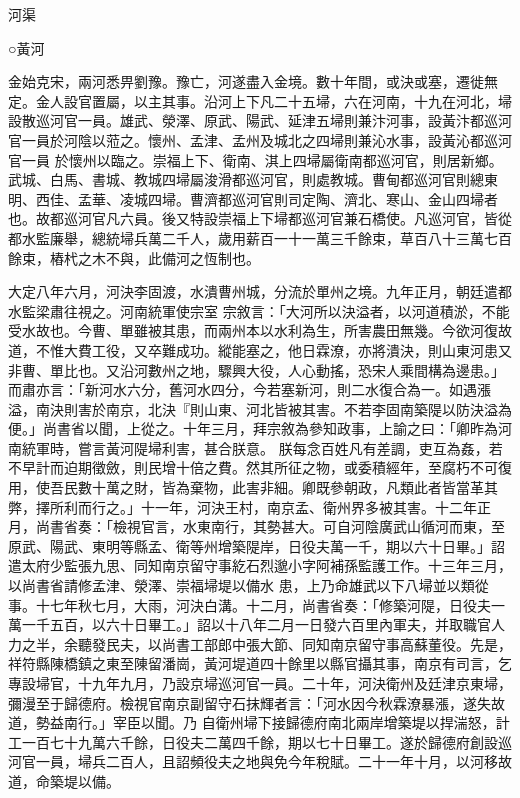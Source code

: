 
\begin{pinyinscope}

 河渠



 ○黃河



 金始克宋，兩河悉畀劉豫。豫亡，河遂盡入金境。數十年間，或決或塞，遷徙無定。金人設官置屬，以主其事。沿河上下凡二十五埽，六在河南，十九在河北，埽設散巡河官一員。雄武、滎澤、原武、陽武、延津五埽則兼汴河事，設黃汴都巡河官一員於河陰以蒞之。懷州、孟津、孟州及城北之四埽則兼沁水事，設黃沁都巡河官一員
 於懷州以臨之。崇福上下、衛南、淇上四埽屬衛南都巡河官，則居新鄉。武城、白馬、書城、教城四埽屬浚滑都巡河官，則處教城。曹甸都巡河官則總東明、西佳、孟華、凌城四埽。曹濟都巡河官則司定陶、濟北、寒山、金山四埽者也。故都巡河官凡六員。後又特設崇福上下埽都巡河官兼石橋使。凡巡河官，皆從都水監廉舉，總統埽兵萬二千人，歲用薪百一十一萬三千餘束，草百八十三萬七百餘束，樁杙之木不與，此備河之恆制也。



 大定八年六月，河決李固渡，水潰曹州城，分流於單州之境。九年正月，朝廷遣都水監梁肅往視之。河南統軍使宗室
 宗敘言：「大河所以決溢者，以河道積淤，不能受水故也。今曹、單雖被其患，而兩州本以水利為生，所害農田無幾。今欲河復故道，不惟大費工役，又卒難成功。縱能塞之，他日霖潦，亦將潰決，則山東河患又非曹、單比也。又沿河數州之地，驟興大役，人心動搖，恐宋人乘間構為邊患。」而肅亦言：「新河水六分，舊河水四分，今若塞新河，則二水復合為一。如遇漲溢，南決則害於南京，北決『則山東、河北皆被其害。不若李固南築隄以防決溢為便。」尚書省以聞，上從之。十年三月，拜宗敘為參知政事，上諭之曰：「卿昨為河南統軍時，嘗言黃河隄埽利害，甚合朕意。
 朕每念百姓凡有差調，吏互為姦，若不早計而迫期徵斂，則民增十倍之費。然其所征之物，或委積經年，至腐朽不可復用，使吾民數十萬之財，皆為棄物，此害非細。卿既參朝政，凡類此者皆當革其弊，擇所利而行之。」十一年，河決王村，南京孟、衛州界多被其害。十二年正月，尚書省奏：「檢視官言，水東南行，其勢甚大。可自河陰廣武山循河而東，至原武、陽武、東明等縣孟、衛等州增築隄岸，日役夫萬一千，期以六十日畢。」詔遣太府少監張九思、同知南京留守事紇石烈邈小字阿補孫監護工作。十三年三月，以尚書省請修孟津、滎澤、崇福埽堤以備水
 患，上乃命雄武以下八埽並以類從事。十七年秋七月，大雨，河決白溝。十二月，尚書省奏：「修築河隄，日役夫一萬一千五百，以六十日畢工。」詔以十八年二月一日發六百里內軍夫，并取職官人力之半，余聽發民夫，以尚書工部郎中張大節、同知南京留守事高蘇董役。先是，祥符縣陳橋鎮之東至陳留潘崗，黃河堤道四十餘里以縣官攝其事，南京有司言，乞專設埽官，十九年九月，乃設京埽巡河官一員。二十年，河決衛州及廷津京東埽，彌漫至于歸德府。檢視官南京副留守石抹輝者言：「河水因今秋霖潦暴漲，遂失故道，勢益南行。」宰臣以聞。乃
 自衛州埽下接歸德府南北兩岸增築堤以捍湍怒，計工一百七十九萬六千餘，日役夫二萬四千餘，期以七十日畢工。遂於歸德府創設巡河官一員，埽兵二百人，且詔頻役夫之地與免今年稅賦。二十一年十月，以河移故道，命築堤以備。




\end{pinyinscope}
